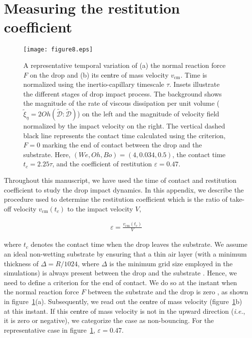 \documentclass{jfm}
\newcommand{\Ohn}{\mathit{Oh}}
\newcommand{\Wen}{\mathit{We}}
\newcommand{\Bon}{\mathit{Bo}}
\newcommand{\revRev}[1]{\textcolor{black}{#1}}
\begin{document}
\appendix

\section{Measuring the restitution coefficient}\label{app:restitution in simulations}

\begin{figure}
	\centering
	\texttt{[image: figure8.eps]}
	\caption{A representative temporal variation of (a) the normal reaction force $F$ on the drop and (b) its \revRev{centre} of mass velocity $v_{\text{cm}}$. Time is normalized using the inertio-capillary timescale $\tau$. Insets illustrate the different stages of drop impact process. The background shows the magnitude of the rate of viscous dissipation per unit volume ($\tilde{\xi}_\eta = 2Oh\left(\boldsymbol{\tilde{\mathcal{D}}:\tilde{\mathcal{D}}}\right)$) on the left and the magnitude of velocity field normalized by the impact velocity on the right. The vertical dashed black line represents the contact time calculated using the criterion, $F = 0$ marking the end of contact between the drop and the substrate. Here, $\left(\Wen, \Ohn, \Bon\right) = \left(4, 0.034, 0.5\right)$, the contact time $t_c = 2.25\tau$, and the coefficient of restitution $\varepsilon = 0.47$.}
	\label{fig:AppendixRestitution}
\end{figure}

Throughout this manuscript, we have used the time of contact and restitution coefficient to study the drop impact dynamics. In this appendix, we describe the procedure used to determine the restitution coefficient which is the ratio of take-off velocity $v_{\text{cm}}(t_c)$ to the impact velocity $V$,

\begin{align}
	\varepsilon = \frac{v_{\text{cm}}(t_c)}{V}
\end{align}

\noindent where $t_c$ denotes the contact time when the drop leaves the substrate. We assume an ideal non-wetting substrate by ensuring that a thin air layer (with a minimum thickness of $\Delta = R/1024$, where $\Delta$ is the minimum grid size employed in the simulations) is always present between the drop and the substrate \citep[also see][]{ramirezsoto-2020-sciadv}. Hence, we need to define a criterion for the end of contact. We do so at the instant when the normal reaction force $F$ between the substrate and the drop is zero \citep[for calculation details, see][]{zhang2022impact}, as shown in figure~\ref{fig:AppendixRestitution}(a). Subsequently, we read out the \revRev{centre} of mass velocity (figure~\ref{fig:AppendixRestitution}b) at this instant. If this \revRev{centre} of mass velocity is not in the upward direction ({\it i.e.}, it is zero or negative), we categorize the case as non-bouncing. For the representative case in figure~\ref{fig:AppendixRestitution}, $\varepsilon = 0.47$. 
\end{document}
